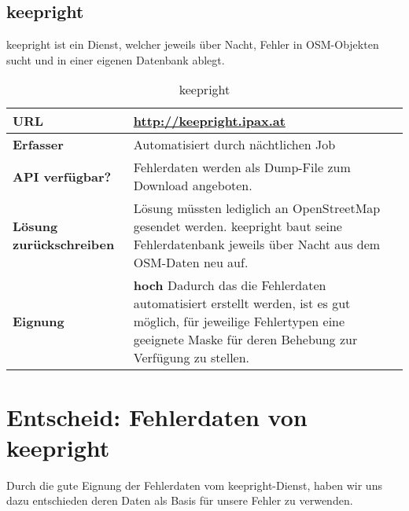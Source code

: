 \subsection{keepright}
keepright ist ein Dienst, welcher jeweils über Nacht, Fehler in OSM-Objekten sucht und in einer eigenen Datenbank ablegt.

\begin{table}[H]
\centering
\begin{tabular}{|p{0.25\twocelltabwidth}|p{0.75\twocelltabwidth}|}
\hline 
\small{\textbf{URL}} & \url{http://keepright.ipax.at} \\
\hline 
\small{\textbf{Erfasser}} & Automatisiert durch nächtlichen Job \\
\hline 
\small{\textbf{API verfügbar?}} & Fehlerdaten werden als Dump-File zum Download angeboten. \\
\hline 
\small{\textbf{Lösung zurückschreiben}} & Lösung müssten lediglich an OpenStreetMap gesendet werden. keepright baut seine Fehlerdatenbank jeweils über Nacht aus dem OSM-Daten neu auf. \\
\hline
\small{\textbf{Eignung}} & \textbf{hoch} \linebreak Dadurch das die Fehlerdaten automatisiert erstellt werden, ist es gut möglich, für jeweilige Fehlertypen eine geeignete Maske für deren Behebung zur Verfügung zu stellen. \\
\hline
\end{tabular}
\caption{keepright}
\label{datenquellen-keepright}
\end{table}

\section{Entscheid: Fehlerdaten von keepright}
Durch die gute Eignung der Fehlerdaten vom keepright-Dienst, haben wir uns dazu entschieden deren Daten als Basis für unsere Fehler zu verwenden.